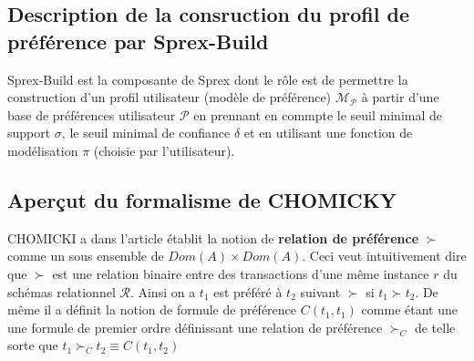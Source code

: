 \documentclass[a4paper,12pt,openany,oneside]{article}
\begin{document}
\subsection{Description de la consruction du profil de préférence par Sprex-Build}
Sprex-Build est la composante de Sprex dont le rôle est de permettre la construction d'un profil utilisateur (modèle de préférence) $\mathcal{M}_\mathcal{P}$ à partir d'une base de préférences utilisateur $\mathcal{P}$ en prennant en commpte le seuil minimal de support $\sigma$, le seuil minimal de confiance $\delta$ et en utilisant une fonction de modélisation $\pi$ (choisie par l'utilisateur). 














\subsection{Aperçut du formalisme de CHOMICKY}
 	CHOMICKI a dans l'article \cite{CHO} établit la notion de \textbf{relation de préférence} $\succ$ comme un  sous ensemble de $Dom(A)\times Dom(A)$. Ceci veut intuitivement dire que $\succ$ est une relation binaire entre des transactions d'une même instance $r$ du schémas relationnel $\mathcal{R}$. Ainsi on a $t_{1}$ est préféré à $t_{2}$ suivant $\succ$ si $t_{1}\succ t_{2}$. De même il a définit la notion de formule de préférence $C(t_{1},t_{1})$ comme étant une une formule de premier ordre définissant une relation de préférence $\succ_{C}$ de telle sorte que $t_{1}\succ_{C} t_{2}\equiv C(t_{1},t_{2})$ \\
 	
\end{document}
